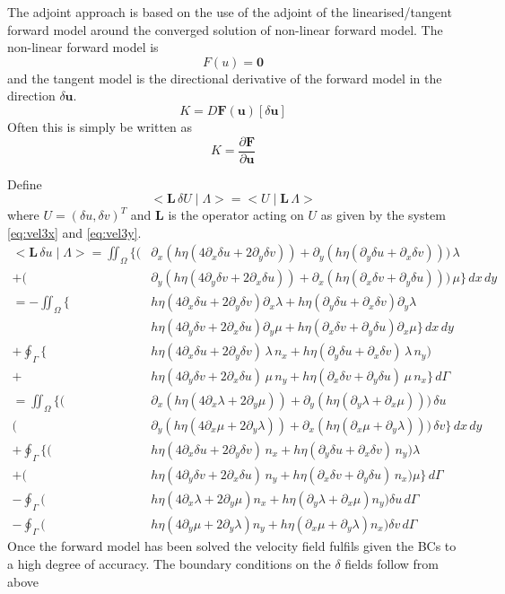 \documentclass[10pt,a4paper]{book}
\newcommand{\p}{\partial}
\begin{document}
The adjoint approach is based on the use of the adjoint of the
linearised/tangent forward model around the converged solution of non-linear
forward model.  The non-linear forward model is 
\[ F(u)=\bm{0} \] and the tangent model is the directional
derivative of the forward model in the direction $\delta \bm{u}$.
\[
K=D \bm{F}(\bm{u})[\delta \bm{u}]
\]
Often this is simply be written as
\[
K=\frac{\p \bm{F}}{\p {\bm{u}}}
\]

Define
\[
<\bm{L}\, \delta U\mid \Lambda> = < U\mid \bm{L}\, \Lambda>
\]
where $U=(\delta u,\delta v)^T$ and $\bm{L}$ is the operator acting on $U$ as given by the system \eqref{eq:vel3x} and \eqref{eq:vel3y}.
\begin{align*}
<\bm{L} \, \delta u\mid \Lambda > 
= \iint_{\Omega}   \big \{ ( &\p_x ( h \eta ( 4 \p_x \delta u + 2 \p_y \delta v)) + \p_y ( h \eta (\p_y \delta u + \p_x \delta v))) \, \lambda \\
                           +(&\p_y (  h \eta ( 4 \p_y \delta v + 2 \p_x \delta u )) +\p_x ( h \eta (\p_x \delta v + \p_y \delta u ))) \, \mu \big \} \, dx \, dy \\
 =  -\iint_{\Omega} \big \{ &h \eta ( 4 \p_x \delta u + 2 \p_y \delta v ) \p_x \lambda +  h \eta (\p_y \delta u + \p_x \delta v) \p_y \lambda  \\
                            &h \eta ( 4 \p_y \delta v + 2 \p_x \delta u ) \p_y \mu     +  h \eta (\p_x \delta v + \p_y \delta u) \p_x \mu \big \} \, dx \, dy \\
+ \oint_{\Gamma} \big \{ &h \eta ( 4\p_x \delta u + 2 \p_y \delta v) \, \lambda \, n_x +  h \eta (\p_y \delta u + \p_x \delta v) \, \lambda \, n_y )  \\
+                        &h \eta ( 4\p_y \delta v + 2 \p_x \delta u) \, \mu \, n_y     +  h \eta (\p_x \delta v + \p_y \delta u) \, \mu \, n_x   \big \} \, d\Gamma\\
=  \iint_{\Omega} \big \{ (&\p_x ( h \eta ( 4 \p_x \lambda + 2 \p_y \mu )) +  \p_y ( h \eta (\p_y \lambda + \p_x \mu))) \, \delta u \\
                          (&\p_y ( h \eta ( 4 \p_x \mu + 2 \p_y \lambda )) + \p_x  ( h \eta (\p_x \mu + \p_y \lambda)))  \, \delta v \big \} \, dx \, dy\\
+ \oint_{\Gamma} \big \{ (&h \eta ( 4\p_x \delta u + 2 \p_y \delta v)  \, n_x +  h \eta (\p_y \delta u + \p_x \delta v) \,  n_y ) \lambda  \\
+                        (&h \eta ( 4\p_y \delta v + 2 \p_x \delta u)  \, n_y +  h \eta (\p_x \delta v + \p_y \delta u) \,  n_x ) \mu  \big \} \, d\Gamma\\
  -\oint_{\Gamma} ( &h \eta ( 4 \p_x \lambda + 2 \p_y \mu )  n_x +   h \eta (\p_y \lambda + \p_x \mu) n_y ) \delta u \,d\Gamma \nonumber \\
  -\oint_{\Gamma} ( &h \eta ( 4 \p_y \mu + 2 \p_y \lambda )  n_y +   h \eta (\p_x \mu + \p_y \lambda)  n_x ) \delta v \, d\Gamma \nonumber 
\end{align*}
Once the forward model has been solved the velocity field fulfils given
the BCs to a high degree of accuracy.  The boundary conditions on
the $\delta$ fields follow from above
\end{document}
